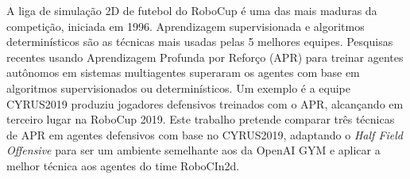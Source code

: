 A liga de simulação 2D de futebol do RoboCup é uma das mais maduras da competição, iniciada em 1996. Aprendizagem supervisionada e algoritmos determinísticos são as técnicas mais usadas pelas 5 melhores equipes. Pesquisas recentes usando Aprendizagem Profunda por Reforço (APR) para treinar agentes autônomos em sistemas multiagentes superaram os agentes com base em algoritmos supervisionados ou determinísticos. Um exemplo é a equipe CYRUS2019 produziu jogadores defensivos treinados com o APR, alcançando em terceiro lugar na RoboCup 2019. Este trabalho pretende comparar três técnicas de APR em agentes defensivos com base no CYRUS2019, adaptando o \textit{Half Field Offensive} para ser um ambiente semelhante aos da OpenAI GYM e aplicar a melhor técnica aos agentes do time RoboCIn2d.